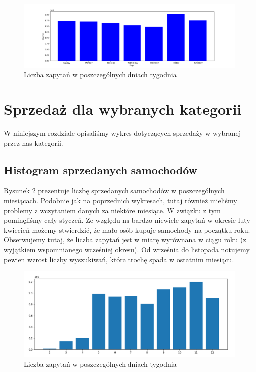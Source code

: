 \documentclass[a4paper,11pt]{article}
\begin{document}
\begin{figure}[!ht]
\centering
\includegraphics[width=1.0\textwidth]{images/liczba_zapytan_w_dniach_tygodnia.png}
\caption{\label{fig:zapytaniaDni} Liczba zapytań w poszczególnych dniach tygodnia}
\end{figure}

\section{Sprzedaż dla wybranych kategorii}
W niniejszym rozdziale opisaliśmy wykres dotyczących sprzedaży w wybranej przez nas kategorii.

\subsection{Histogram sprzedanych samochodów}

Rysunek \ref{fig:sprzedaneSamochody} prezentuje liczbę sprzedanych samochodów w poszczególnych miesiącach. Podobnie jak na poprzednich wykresach, tutaj również mieliśmy problemy z wczytaniem danych za niektóre miesiące. W związku z tym pominęliśmy cały styczeń. Ze względu na bardzo niewiele zapytań w okresie luty-kwiecień możemy stwierdzić, że mało osób kupuje samochody na początku roku. Obserwujemy tutaj, że liczba zapytań jest w miarę wyrównana w ciągu roku (z wyjątkiem wspomnianego wcześniej okresu). Od września do listopada notujemy pewien wzrost liczby wyszukiwań, która trochę spada w ostatnim miesiącu.

\begin{figure}[!ht]
\centering
\includegraphics[width=1.0\textwidth]{images/sprzedane_samochody.png}
\caption{\label{fig:sprzedaneSamochody} Liczba zapytań w poszczególnych dniach tygodnia}
\end{figure}
\end{document}
